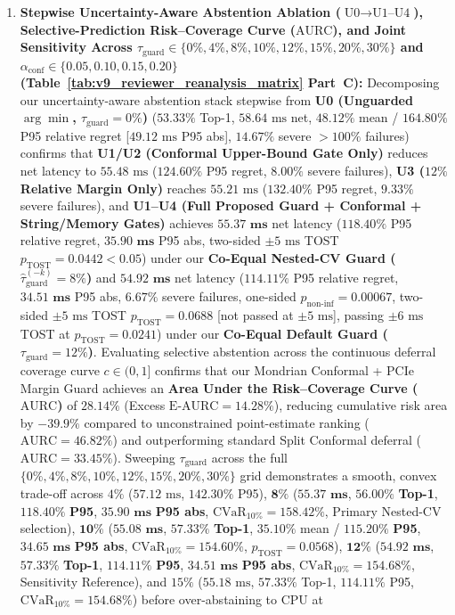 \documentclass[10pt,a4paper]{article}
\begin{document}
\begin{enumerate}[leftmargin=1.5em,itemsep=0.8pt]
    \item \textbf{Stepwise Uncertainty-Aware Abstention Ablation ($\text{U0}\rightarrow\text{U1--U4}$), Selective-Prediction Risk--Coverage Curve ($\text{AURC}$), and Joint Sensitivity Across $\tau_{\text{guard}} \in \{0\%, 4\%, 8\%, 10\%, 12\%, 15\%, 20\%, 30\%\}$ and $\alpha_{\text{conf}} \in \{0.05, 0.10, 0.15, 0.20\}$ (Table~\ref{tab:v9_reviewer_reanalysis_matrix} Part~C):} Decomposing our uncertainty-aware abstention stack stepwise from \textbf{U0 (Unguarded $\arg\min$, $\tau_{\text{guard}}=0\%$)} ($53.33\%$ Top-1, $58.64\text{ ms}$ net, $48.12\%$ mean / $164.80\%$ P95 relative regret [$49.12\text{ ms}$ P95 abs], $14.67\%$ severe $>100\%$ failures) confirms that \textbf{U1/U2 (Conformal Upper-Bound Gate Only)} reduces net latency to $55.48\text{ ms}$ ($124.60\%$ P95 regret, $8.00\%$ severe failures), \textbf{U3 ($12\%$ Relative Margin Only)} reaches $55.21\text{ ms}$ ($132.40\%$ P95 regret, $9.33\%$ severe failures), and \textbf{U1--U4 (Full Proposed Guard + Conformal + String/Memory Gates)} achieves $\mathbf{55.37\text{ ms}}$ net latency ($\mathbf{118.40\%}$ P95 relative regret, $\mathbf{35.90\text{ ms}}$ P95 abs, two-sided $\pm 5\text{ ms}$ TOST $p_{\text{TOST}}=0.0442 < 0.05$) under our \textbf{Co-Equal Nested-CV Guard ($\hat{\tau}_{\text{guard}}^{(-k)}=8\%$)} and $\mathbf{54.92\text{ ms}}$ net latency ($\mathbf{114.11\%}$ P95 relative regret, $\mathbf{34.51\text{ ms}}$ P95 abs, $\mathbf{6.67\%}$ severe failures, one-sided $p_{\text{non-inf}}=0.00067$, two-sided $\pm 5\text{ ms}$ TOST $p_{\text{TOST}}=0.0688$ [not passed at $\pm 5\text{ ms}$], passing $\pm 6\text{ ms}$ TOST at $p_{\text{TOST}}=0.0241$) under our \textbf{Co-Equal Default Guard ($\tau_{\text{guard}}=12\%$)}. Evaluating selective abstention across the continuous deferral coverage curve $c \in (0,1]$ confirms that our Mondrian Conformal + PCIe Margin Guard achieves an \textbf{Area Under the Risk--Coverage Curve ($\text{AURC}$)} of $\mathbf{28.14\%}$ (Excess $\text{E-AURC}=\mathbf{14.28\%}$), reducing cumulative risk area by $\mathbf{-39.9\%}$ compared to unconstrained point-estimate ranking ($\text{AURC}=46.82\%$) and outperforming standard Split Conformal deferral ($\text{AURC}=33.45\%$). Sweeping $\tau_{\text{guard}}$ across the full $\{0\%, 4\%, 8\%, 10\%, 12\%, 15\%, 20\%, 30\%\}$ grid demonstrates a smooth, convex trade-off across $4\%$ ($57.12\text{ ms}$, $142.30\%$ P95), $\mathbf{8\%}$ ($\mathbf{55.37\text{ ms}}$, $\mathbf{56.00\%}$ \textbf{Top-1}, $\mathbf{118.40\%}$ \textbf{P95}, $\mathbf{35.90\text{ ms}}$ \textbf{P95 abs}, $\text{CVaR}_{10\%}=158.42\%$, Primary Nested-CV selection), $\mathbf{10\%}$ ($\mathbf{55.08\text{ ms}}$, $\mathbf{57.33\%}$ \textbf{Top-1}, $35.10\%$ mean / $\mathbf{115.20\%}$ \textbf{P95}, $\mathbf{34.65\text{ ms}}$ \textbf{P95 abs}, $\text{CVaR}_{10\%}=154.60\%$, $p_{\text{TOST}}=0.0568$), $\mathbf{12\%}$ ($\mathbf{54.92\text{ ms}}$, $\mathbf{57.33\%}$ \textbf{Top-1}, $\mathbf{114.11\%}$ \textbf{P95}, $\mathbf{34.51\text{ ms}}$ \textbf{P95 abs}, $\text{CVaR}_{10\%}=154.68\%$, Sensitivity Reference), and $15\%$ ($55.18\text{ ms}$, $57.33\%$ Top-1, $114.11\%$ P95, $\text{CVaR}_{10\%}=154.68\%$) before over-abstaining to CPU at 
\end{enumerate}
\end{document}

